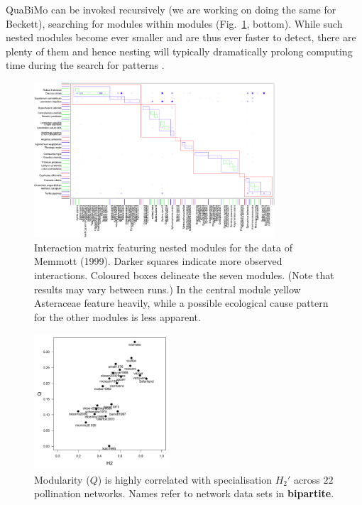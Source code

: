 \documentclass[a4paper, 11pt]{article}\usepackage[]{graphicx}\usepackage[]{color}
\newcommand{\package}[1]{\textbf{#1}}
\begin{document}
QuaBiMo can be invoked recursively (we are working on doing the same for Beckett), searching for modules within modules (Fig.~\ref{fig:memmottmodules}, bottom). While such nested modules become ever smaller and are thus ever faster to detect, there are plenty of them and hence nesting will typically dramatically prolong computing time during the search for patterns \citep{Memmott1999}.
\begin{figure}
	\includegraphics[width=0.8\textwidth]{figures/memmott1999_nested_modules_small.png}
	\caption{Interaction matrix featuring nested modules for the data of Memmott (1999). %
	Darker squares indicate more observed interactions. Coloured boxes delineate the seven modules. (Note that results may vary between runs.) In the central module yellow Asteraceae feature heavily, while a possible ecological cause pattern for the other modules is less apparent. %
	}
\label{fig:memmottmodules}
\end{figure}
%
\begin{figure}
	\centering
	\includegraphics[width=0.45\textwidth]{figures/poll_mod_QvsH2}
	\caption{Modularity ($Q$) is highly correlated with specialisation $H_2'$ across $22$ pollination networks. Names refer to network data sets in \package{bipartite}.}
\label{fig:QvsH2}
\end{figure}
\end{document}
